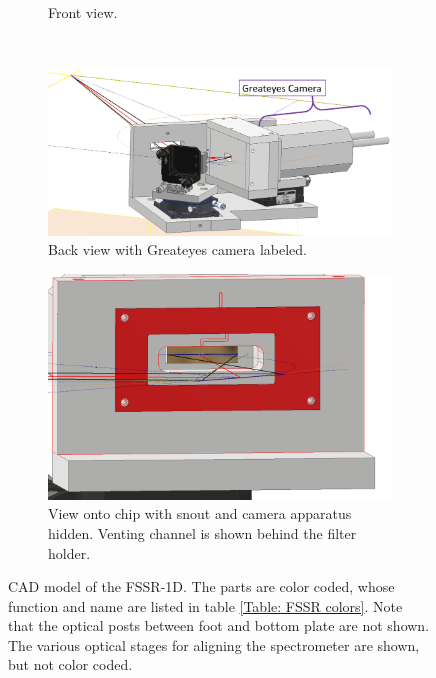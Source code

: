 \begin{figure} [H]
\begin{subfigure}[t]{0.56\textwidth}
		\caption{Front view.}
		\label{InvFSSRFullFront}
	\end{subfigure}\\[1ex]
	\centering
	\begin{subfigure}[t]{0.6\textwidth}
	\centering
		\includegraphics[width=\textwidth]{InventorPics/FSSRFullBack.PNG}
		\caption{Back view with Greateyes camera labeled.}
		\label{InvFSSRFullBack}
	\end{subfigure}%
	\begin{subfigure}[t]{0.38\textwidth}
	\centering
		\includegraphics[width=\textwidth]{InventorPics/FSSRCameraNoSnout.PNG}
		\caption{View onto chip with snout and camera apparatus 
		hidden. 
		Venting channel is shown behind the filter holder.}
		\label{InvFSSRPartCamera}
	\end{subfigure}
	\caption{CAD model of the FSSR-1D. The parts are color coded, 
	whose 
	function and name are listed in table \ref{Table: FSSR 
	colors}. 
	Note that the optical posts between foot and bottom plate are 
	not 
	shown. The various optical stages for aligning the 
	spectrometer are 
	shown, but not color coded.}
	\label{InvFSSR}
\end{figure}

